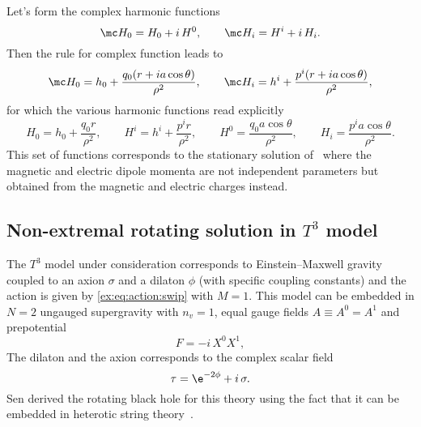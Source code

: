 Let's form the complex harmonic functions
\begin{equation}
	\mc H_0 = H_0 + i\, H^0, \qquad
	\mc H_i = H^i + i\, H_i.
\end{equation} 
Then the rule for complex function leads to
\begin{equation}
	\mc H_0 = h_0 + \frac{q_0 (r + i a \cos\theta)}{\rho^2}, \qquad
	\mc H_i = h^i + \frac{p^i (r + i a \cos\theta)}{\rho^2},
\end{equation} 
for which the various harmonic functions read explicitly
\begin{equation}
	H_0 = h_0 + \frac{q_0 r}{\rho^2}, \qquad
	H^i = h^i + \frac{p^i r}{\rho^2}, \qquad
	H^0 = \frac{q_0 a \cos\theta}{\rho^2}, \qquad
	H_i = \frac{p^i a \cos\theta}{\rho^2}.
\end{equation}
This set of functions corresponds to the stationary solution of~\cite[sec.~4.4]{Behrndt:1998:StationarySolutionsN2} where the magnetic and electric dipole momenta are not independent parameters but obtained from the magnetic and electric charges instead.


\subsection{Non-extremal rotating solution in \texorpdfstring{$T^3$}{T3} model}
\label{sec:examples:rotating-T3}



The $T^3$ model under consideration corresponds to Einstein--Maxwell gravity coupled to an axion $\sigma$ and a dilaton $\phi$ (with specific coupling constants) and the action is given by \eqref{ex:eq:action:swip} with $M = 1$.
This model can be embedded in $N = 2$ ungauged supergravity with $n_v = 1$, equal gauge fields $A \equiv A^0 = A^1$ and prepotential\footnotemark{}%
\begin{equation}
	F = - i\, X^0 X^1,
\end{equation} 
The dilaton and the axion corresponds to the complex scalar field
\begin{equation}
	\tau = \e^{-2\phi} + i\, \sigma.
\end{equation} 
Sen derived the rotating black hole for this theory using the fact that it can be embedded in heterotic string theory~\cite{Sen:1992:RotatingChargedBlack}.

